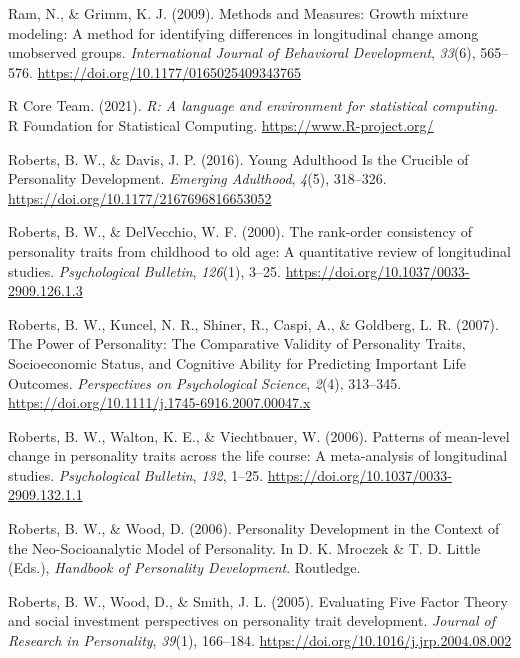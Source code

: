 \documentclass[
  english,
  man, noextraspace]{apa7}
\begin{document}
\leavevmode\hypertarget{ref-ramMethodsMeasuresGrowth2009}{}%
Ram, N., \& Grimm, K. J. (2009). Methods and Measures: Growth mixture modeling: A method for identifying differences in longitudinal change among unobserved groups. \emph{International Journal of Behavioral Development}, \emph{33}(6), 565--576. \url{https://doi.org/10.1177/0165025409343765}

\leavevmode\hypertarget{ref-R-base}{}%
R Core Team. (2021). \emph{R: A language and environment for statistical computing}. R Foundation for Statistical Computing. \url{https://www.R-project.org/}

\leavevmode\hypertarget{ref-robertsYoungAdulthoodCrucible2016}{}%
Roberts, B. W., \& Davis, J. P. (2016). Young Adulthood Is the Crucible of Personality Development. \emph{Emerging Adulthood}, \emph{4}(5), 318--326. \url{https://doi.org/10.1177/2167696816653052}

\leavevmode\hypertarget{ref-robertsRankorderConsistencyPersonality2000}{}%
Roberts, B. W., \& DelVecchio, W. F. (2000). The rank-order consistency of personality traits from childhood to old age: A quantitative review of longitudinal studies. \emph{Psychological Bulletin}, \emph{126}(1), 3--25. \url{https://doi.org/10.1037/0033-2909.126.1.3}

\leavevmode\hypertarget{ref-robertsPowerPersonalityComparative2007}{}%
Roberts, B. W., Kuncel, N. R., Shiner, R., Caspi, A., \& Goldberg, L. R. (2007). The Power of Personality: The Comparative Validity of Personality Traits, Socioeconomic Status, and Cognitive Ability for Predicting Important Life Outcomes. \emph{Perspectives on Psychological Science}, \emph{2}(4), 313--345. \url{https://doi.org/10.1111/j.1745-6916.2007.00047.x}

\leavevmode\hypertarget{ref-robertsPatternsMeanlevelChange2006a}{}%
Roberts, B. W., Walton, K. E., \& Viechtbauer, W. (2006). Patterns of mean-level change in personality traits across the life course: A meta-analysis of longitudinal studies. \emph{Psychological Bulletin}, \emph{132}, 1--25. \url{https://doi.org/10.1037/0033-2909.132.1.1}

\leavevmode\hypertarget{ref-robertsPersonalityDevelopmentContext2006}{}%
Roberts, B. W., \& Wood, D. (2006). Personality Development in the Context of the Neo-Socioanalytic Model of Personality. In D. K. Mroczek \& T. D. Little (Eds.), \emph{Handbook of Personality Development}. Routledge.

\leavevmode\hypertarget{ref-robertsEvaluatingFiveFactor2005}{}%
Roberts, B. W., Wood, D., \& Smith, J. L. (2005). Evaluating Five Factor Theory and social investment perspectives on personality trait development. \emph{Journal of Research in Personality}, \emph{39}(1), 166--184. \url{https://doi.org/10.1016/j.jrp.2004.08.002}
\end{document}
